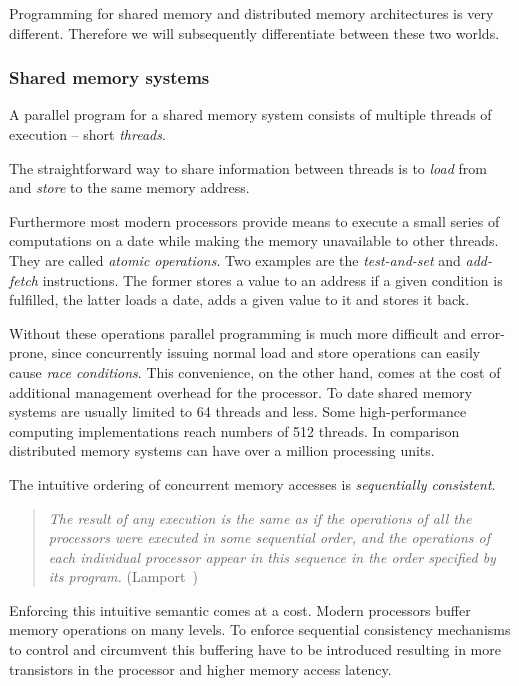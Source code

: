 \documentclass[a4paper, 10pt]{article}
\begin{document}
Programming for shared memory and distributed memory architectures is very different. Therefore we will subsequently differentiate between these two worlds.

\subsubsection{Shared memory systems}
\label{sssec:background-means-shared}
A parallel program for a shared memory system consists of multiple threads of execution -- short \emph{threads}.

The straightforward way to share information between threads is to \emph{load} from and \emph{store} to the same memory address.

Furthermore most modern processors provide means to execute a small series of computations on a date while making the memory unavailable to other threads. They are called \emph{atomic operations}. Two examples are the \emph{test-and-set} and \emph{add-fetch} instructions. The former stores a value to an address if a given condition is fulfilled, the latter loads a date, adds a given value to it and stores it back.

Without these operations parallel programming is much more difficult and error-prone, since concurrently issuing normal load and store operations can easily cause \emph{race conditions}. This convenience, on the other hand, comes at the cost of additional management overhead for the processor. To date shared memory systems are usually limited to 64 threads and less. Some high-performance computing implementations reach numbers of 512 threads. In comparison distributed memory systems can have over a million processing units.

The intuitive ordering of concurrent memory accesses is \emph{sequentially consistent}.
\begin{quote}
	\textit{The result of any execution is the same as if the operations of all the processors were executed in some sequential order, and the operations of each individual processor appear in this sequence in the order specified by its program.} (Lamport~\cite{sequentialconsistency})
\end{quote}

Enforcing this intuitive semantic comes at a cost. Modern processors buffer memory operations on many levels. To enforce sequential consistency mechanisms to control and circumvent this buffering have to be introduced resulting in more transistors in the processor and higher memory access latency.
\end{document}
